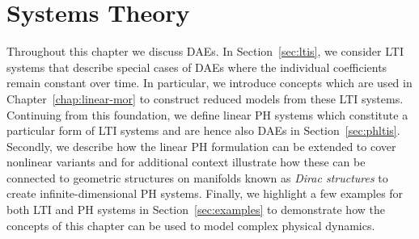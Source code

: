 \chapter{Systems Theory}\label{chap:systems-theory}

Throughout this chapter we discuss \acp{DAE}.
In Section~\ref{sec:ltis}, we consider \ac{LTI} systems that describe special cases of \acp{DAE} where the individual coefficients remain constant over time.
In particular, we introduce concepts which are used in Chapter~\ref{chap:linear-mor} to construct reduced models from these \ac{LTI} systems.
Continuing from this foundation, we define linear \ac{PH} systems which constitute a particular form of \ac{LTI} systems and are hence also \acp{DAE} in Section~\ref{sec:phltis}.
Secondly, we describe how the linear \ac{PH} formulation can be extended to cover nonlinear variants and for additional context illustrate how these can be connected to geometric structures on manifolds known as \emph{Dirac structures} to create infinite-dimensional \ac{PH} systems.
Finally, we highlight a few examples for both \ac{LTI} and \ac{PH} systems in Section~\ref{sec:examples} to demonstrate how the concepts of this chapter can be used to model complex physical dynamics.




